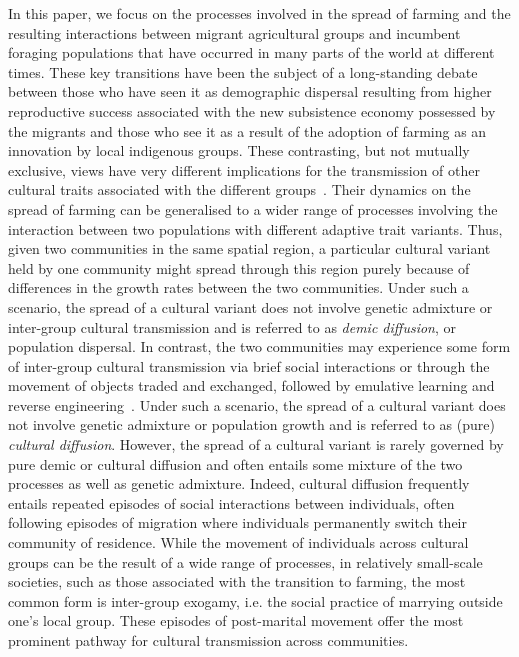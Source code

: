 \documentclass[9pt,twocolumn,twoside,lineno]{pnas-new}
\begin{document}
{\color{red} In this paper, we focus on the processes involved in the spread of farming and the resulting interactions between migrant agricultural groups and incumbent foraging populations that have occurred in many parts of the world at different times. 
These key transitions have been the subject of a long-standing debate between those who have seen it as demographic dispersal resulting from higher reproductive success associated with the new subsistence economy possessed by the migrants and those who see it as a result of the adoption of farming as an innovation by local indigenous groups. 
These contrasting, but not mutually exclusive, views have very different implications for the transmission of other cultural traits associated with the different groups~\citep{ammerman_neolithic_1984,fort_synthesis_2012}. 
Their dynamics on the spread of farming can be generalised to a wider range of processes involving the interaction between two populations with different adaptive trait variants.}
Thus, given two communities in the same spatial region, a particular cultural variant held by one community might spread through this region purely because of differences in the growth rates between the two communities. 
Under such a scenario, the spread of a cultural variant does not involve genetic admixture or inter-group cultural transmission and is referred to as \emph{demic diffusion}, or population dispersal.
In contrast, the two communities may experience some form of inter-group cultural transmission via brief social interactions or through the movement of objects traded and exchanged, followed by emulative learning and reverse engineering~\citep{crema_how_2023}. 
Under such a scenario, the spread of a cultural variant does not involve genetic admixture or population growth and is referred to as (pure) \emph{cultural diffusion}.
However, the spread of a cultural variant is rarely governed by pure demic or cultural diffusion and often entails some mixture of the two processes as well as genetic admixture.
Indeed, cultural diffusion frequently entails repeated episodes of social interactions between individuals, often following episodes of migration where individuals permanently switch their community of residence.  
{\color{red}While the movement of individuals across cultural groups can be the result of a wide range of processes, in relatively small-scale societies, such as those associated with the transition to farming, the most common form is inter-group exogamy, i.e. the social practice of marrying outside one's local group.
These episodes of post-marital movement offer the most prominent pathway for cultural transmission across communities.}
\end{document}
